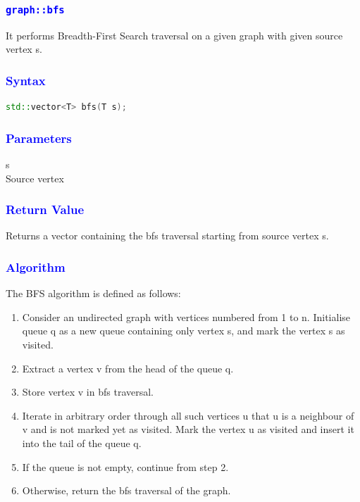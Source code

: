 \documentclass[11pt,a4paper]{article}
\begin{document}
\subsubsection*{\textcolor{blue}{ \Large \texttt{graph::bfs}}}
It performs Breadth-First Search traversal on a given graph with given source vertex s.



\subsubsection*{\textcolor{blue}{ \large {Syntax}}}
\begin{lstlisting}[language=C++]
std::vector<T> bfs(T s);


\end{lstlisting}
\subsubsection*{\textcolor{blue}{ \large {Parameters
}}}
s\\
Source vertex

\subsubsection*{\textcolor{blue}{ \large {Return Value}}}
Returns a vector containing the bfs traversal starting from source vertex s.

\subsubsection*{\textcolor{blue}{ \large {Algorithm}}}
The BFS algorithm is defined as follows:
\begin{enumerate}  
\item Consider an undirected graph with vertices numbered from 1 to n. Initialise queue q as a new queue containing only vertex s, and mark the vertex s as visited.

 
\item Extract a vertex v from the head of the queue q.

\item Store vertex v in bfs traversal.

\item Iterate in arbitrary order through all such vertices u that u is a neighbour of v and is not marked yet as visited. Mark the vertex u as visited and insert it into the tail of the queue q.
\item If the queue is not empty, continue from step 2.
\item Otherwise, return the bfs traversal of the graph.
\end{enumerate}  
\end{document}
